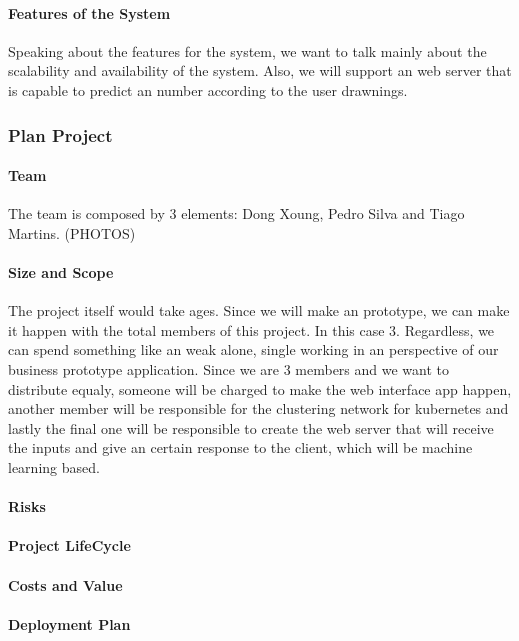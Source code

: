 \paragraph{Features of the System}
 Speaking about the features for the system, we want to talk mainly about the scalability and availability of the system. Also, we will support an web server that is capable to predict an number according to the user drawnings.

\subsubsection{Plan Project}

\paragraph{Team}
 The team is composed by 3 elements: Dong Xoung, Pedro Silva and Tiago Martins.
 (PHOTOS)

\paragraph{Size and Scope} 
 The project itself would take ages. Since we will make an prototype, we can make it happen with the total members of this project. In this case 3. Regardless, we can spend something like an weak alone, single working in an perspective of our business prototype application. Since we are 3 members and we want to distribute equaly, someone will be charged to make the web interface app happen, another member will be responsible for the clustering network for kubernetes and lastly the final one will be responsible to create the web server that will receive the inputs and give an certain response to the client, which will be machine learning based.

\paragraph{Risks}

\paragraph{Project LifeCycle}

\paragraph{Costs and Value}

\paragraph{Deployment Plan}